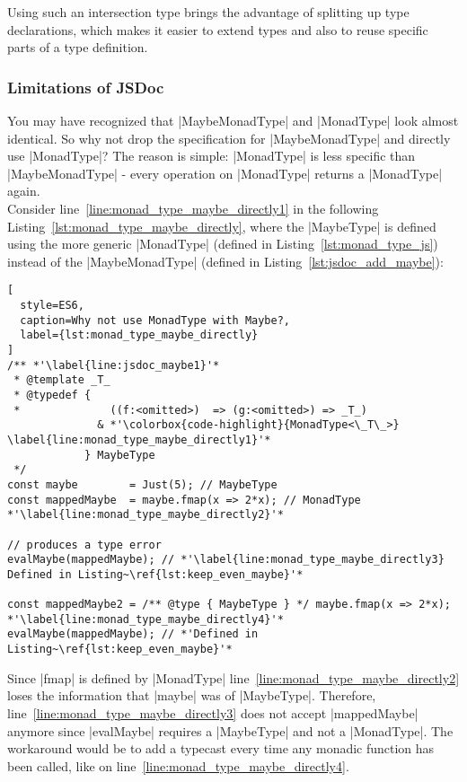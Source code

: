 Using such an intersection type brings the advantage of splitting up type
declarations, which makes it easier to extend types and also to reuse specific
parts of a type definition.

\subsubsection{Limitations of JSDoc} %
\label{sec:Limitations of JSDoc}
You may have recognized that |MaybeMonadType| and |MonadType| look almost
identical. So why not drop the specification for |MaybeMonadType| and directly
use |MonadType|? The reason is simple: |MonadType| is less specific than
|MaybeMonadType| - every operation on |MonadType| returns a |MonadType|
again.\\
Consider line~\ref{line:monad_type_maybe_directly1} in the following
Listing~\ref{lst:monad_type_maybe_directly}, where the |MaybeType| is defined
using the more generic |MonadType| (defined in Listing~\ref{lst:monad_type_js})
instead of the |MaybeMonadType| (defined in Listing~\ref{lst:jsdoc_add_maybe}):

\begin{lstlisting}[
  style=ES6,
  caption=Why not use MonadType with Maybe?,
  label={lst:monad_type_maybe_directly}
]
/** *'\label{line:jsdoc_maybe1}'*
 * @template _T_
 * @typedef { 
 *              ((f:<omitted>)  => (g:<omitted>) => _T_)
              & *'\colorbox{code-highlight}{MonadType<\_T\_>}  \label{line:monad_type_maybe_directly1}'*
            } MaybeType
 */
const maybe        = Just(5); // MaybeType
const mappedMaybe  = maybe.fmap(x => 2*x); // MonadType *'\label{line:monad_type_maybe_directly2}'*

// produces a type error
evalMaybe(mappedMaybe); // *'\label{line:monad_type_maybe_directly3} Defined in Listing~\ref{lst:keep_even_maybe}'*

const mappedMaybe2 = /** @type { MaybeType } */ maybe.fmap(x => 2*x); *'\label{line:monad_type_maybe_directly4}'*
evalMaybe(mappedMaybe); // *'Defined in Listing~\ref{lst:keep_even_maybe}'*
\end{lstlisting}

Since |fmap| is defined by |MonadType|
line~\ref{line:monad_type_maybe_directly2} loses the information that |maybe|
was of |MaybeType|. Therefore, line~\ref{line:monad_type_maybe_directly3} does
not accept |mappedMaybe| anymore since |evalMaybe| requires a |MaybeType| and
not a |MonadType|. The workaround would be to add a typecast every time any
monadic function has been called, like on
line~\ref{line:monad_type_maybe_directly4}.

